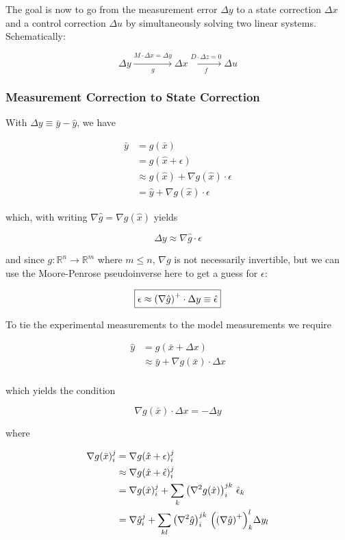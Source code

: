 \documentclass{article}
\begin{document}
The goal is now to go from the measurement error $\Delta y$ to a state correction $\Delta x$ and a control correction $\Delta u$ by simultaneously solving two linear systems.  Schematically:

$$
\Delta y \xrightarrow[g]{M \cdot \Delta x = \Delta y} \Delta x \xrightarrow[f]{D \cdot \Delta z = 0} \Delta u
$$

\subsubsection*{Measurement Correction to State Correction}

With $\Delta y \equiv \bar y - \hat y$, we have

\begin{align*}
  \bar y &= g(\bar x) \\
  &= g(\hat x + \epsilon) \\ 
  &\approx g(\hat x) + \nabla g(\hat x) \cdot \epsilon \\
  &= \hat y + \nabla g(\hat x) \cdot \epsilon
\end{align*}

 
which, with writing $\nabla \hat g = \nabla g(\hat x)$ yields

$$
\Delta y \approx \nabla \hat g \cdot \epsilon
$$


and since $g: \mathbb{R}^n \to \mathbb{R}^m$ where $m \leq n$, $\nabla g$ is not necessarily invertible, but we can use the Moore-Penrose pseudoinverse here to get a guess for $\epsilon$:

$$
\boxed{
\epsilon \approx \qty(\nabla \hat g)^+ \cdot \Delta y \equiv \hat \epsilon
}
$$



To tie the experimental measurements to the model measurements we require 

\begin{align*}
\hat y &= g(\bar x + \Delta x) \\ 
&\approx \bar y + \nabla g(\bar x) \cdot \Delta x \\
\end{align*}


which yields the condition

\begin{equation}
  \boxed{
  \nabla g(\bar x) \cdot \Delta x = - \Delta y
  }
\end{equation}



where

\begin{align*}
  \nabla g(\bar x)_i^j &= \nabla g(\hat x + \epsilon)_i^j \\
  & \approx  \nabla g(\hat x + \hat \epsilon)_i^j \\
  &= \nabla g(\hat x)_i^j + \sum_k \qty(\nabla^2 g(\hat x))_i^{jk} \ \hat \epsilon_k \\
  &= \nabla \hat g_i^j + \sum_{kl} \qty(\nabla^2 \hat g)_i^{jk} \ \qty(\qty(\nabla \hat g)^+)_k^l \Delta y_l 
\end{align*}
\end{document}
